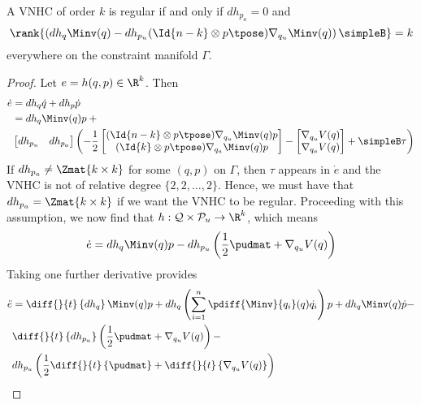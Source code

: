 \begin{thm}\label{thm:vnhc-regularity}
    A VNHC of order \(k\) is regular if and only if \(dh_{p_a} = 0\) 
    and
    \[
        \rank{\left(dh_q \Minv(q) - 
          dh_{p_u} (\Id{n-k} \otimes p\tpose)\nabla_{q_u}\Minv(q) 
         \right)\simpleB} = k
    \]
    everywhere on the constraint manifold \(\Gamma\).
\end{thm}
\begin{proof}
    Let \(e = h(q,p) \in \R^k\). Then 
    \begin{align*}
        \dot{e} &= dh_q \dot{q} + dh_p \dot{p} \\
                &= dh_q \Minv(q)p +{}  \\
            & \begin{bmatrix} dh_{p_u} & dh_{p_a} \end{bmatrix}
        \left( -\frac{1}{2} \begin{bmatrix}
            (\Id{n-k} \otimes p\tpose) \nabla_{q_u}\Minv(q)p \\
            (\Id{k} \otimes p\tpose) \nabla_{q_a}\Minv(q)p
            \end{bmatrix} - \begin{bmatrix}
            \nabla_{q_u}V(q) \\
            \nabla_{q_a}V(q)
        \end{bmatrix} + \simpleB \tau\right)
    \end{align*}
    If \(dh_{p_a} \neq \Zmat{k \times k}\) for some \((q,p)\) on \(\Gamma\), 
    then \(\tau\) appears in \(\dot{e}\) and the VNHC is not of relative degree
    \(\{2,2,\ldots,2\}\).
    Hence, we must have that \(dh_{p_a} = \Zmat{k \times k}\) if we want the
    VNHC to be regular. Proceeding with this assumption, we now find that
    \(h : \mathcal{Q} \times \mathcal{P}_u \rightarrow \R^k\), which means
    \[
        \dot{e} = dh_q \Minv(q)p - 
        dh_{p_u} \left(\frac{1}{2} \pudmat + \nabla_{q_u}V(q)\right)
    \]
    Taking one further derivative provides
    \begin{align*}
        \ddot{e} &= \diff{}{t}\left\{dh_q\right\}\Minv(q) p + 
        dh_q \left(\sum\limits_{i=1}^n \pdiff{\Minv}{q_i}(q)\dot{q_i}\right)p + 
        dh_q \Minv(q) \dot{p} - \\
         & \diff{}{t}\left\{dh_{p_u}\right\}
         \left(\frac{1}{2}\pudmat + \nabla_{q_u}V(q)\right) - \\
         & dh_{p_u}\left(\frac{1}{2}\diff{}{t}\left\{\pudmat\right\} + 
         \diff{}{t}\left\{\nabla_{q_u}V(q)\right\} \right)

\end{align*}
\end{proof}

